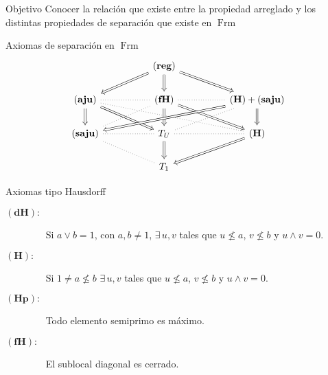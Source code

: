 \documentclass[compress,12pt]{beamer}
\DeclareMathOperator{\Frm}{Frm}
\begin{document}
\begin{frame}{Objetivo}
    \Huge{Conocer la relación que existe entre la propiedad arreglado y los distintas propiedades de separación que existe en $\Frm$}

\end{frame}

\begin{frame}{Axiomas de separación en $\Frm$}
    \[\begin{tikzcd}
	&& {\mathbf{(reg)}} \\
	{\mathbf{(aju)}} && {\mathbf{(fH)}} && {\mathbf{(H)}+\mathbf{(saju)}} \\
	{\mathbf{(saju)}} && {T_U} && {\mathbf{(H)}} \\
	&& {T_1}
	\arrow[Rightarrow, from=1-3, to=2-1]
	\arrow[Rightarrow, from=1-3, to=2-3]
	\arrow[Rightarrow, from=1-3, to=2-5]
	\arrow[dotted, no head, from=2-1, to=2-3]
	\arrow[Rightarrow, from=2-1, to=3-1]
	\arrow[Rightarrow, from=2-1, to=3-3]
	\arrow[dotted, no head, from=2-1, to=3-5]
	\arrow[dotted, no head, from=2-3, to=2-5]
	\arrow[dotted, no head, from=2-3, to=3-1]
	\arrow[Rightarrow, from=2-3, to=3-3]
	\arrow[Rightarrow, from=2-3, to=3-5]
	\arrow[Rightarrow, from=2-5, to=3-1]
	\arrow[dotted, no head, from=2-5, to=3-3]
	\arrow[Rightarrow, from=2-5, to=3-5]
	\arrow[dotted, no head, from=3-1, to=3-3]
	\arrow[dotted, no head, from=3-1, to=4-3]
	\arrow[dotted, no head, from=3-3, to=3-5]
	\arrow[Rightarrow, from=3-3, to=4-3]
	\arrow[Rightarrow, from=3-5, to=4-3]
\end{tikzcd}\]
\end{frame}

\begin{frame}{Axiomas tipo Hausdorff}
    \begin{description}
        \item[$\mathbf{(dH):}$]$\quad$ Si $a\vee b=1$, con $a,b\neq 1$, $\exists\, u,v$ tales que $u\nleq a$, $v\nleq b$ y $u\wedge v=0$.
        \item[$\mathbf{(H):}$]$\quad$ Si $1\neq a\nleq b$ $\exists\, u, v$ tales que $u\nleq a$, $v\nleq b$ y $u\wedge v=0$.
        \item[$\mathbf{(Hp):}$]$\quad$ Todo elemento semiprimo es máximo.
        \item[$\mathbf{(fH):}$]$\quad$ El sublocal diagonal es cerrado.
    \end{description}
\end{frame}
\end{document}
